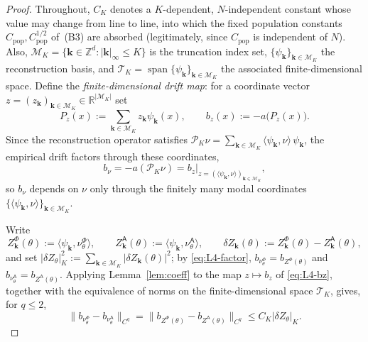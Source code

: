 \documentclass[a4paper,fleqn]{cas-sc}
\theoremstyle{definition}
\theoremstyle{remark}
\begin{document}
\begin{proof}
Throughout, $C_K$ denotes a $K$-dependent, $N$-independent constant whose value may
change from line to line, into which the fixed population constants
$C_{\mathrm{pop}},C_{\mathrm{pop}}^{1/2}$ of~(B3) are absorbed (legitimately, since $C_{\mathrm{pop}}$ is independent of $N$).
Also,
$\mathcal M_K=\{\mathbf k\in\mathbb Z^d:|\mathbf k|_\infty\le K\}$ is the truncation index
set, $\{\psi_{\mathbf k}\}_{\mathbf k\in\mathcal M_K}$ the reconstruction basis, and
$\mathcal T_K=\operatorname{span}\{\psi_{\mathbf k}\}_{\mathbf k\in\mathcal M_K}$ the associated
finite-dimensional space. Define the \emph{finite-dimensional drift map}: for a coordinate vector
$z=(z_{\mathbf k})_{\mathbf k\in\mathcal M_K}\in\mathbb R^{|\mathcal M_K|}$ set
\begin{equation}\label{eq:L4-bz}
P_z(x):=\sum_{\mathbf k\in\mathcal M_K}z_{\mathbf k}\psi_{\mathbf k}(x),\qquad
b_z(x):=-a\bigl(P_z(x)\bigr).
\end{equation}
Since the reconstruction operator satisfies
$\mathcal P_K\nu=\sum_{\mathbf k\in\mathcal M_K}\langle\psi_{\mathbf k},\nu\rangle\,\psi_{\mathbf k}$,
the empirical drift factors through these coordinates,
\begin{equation}\label{eq:L4-factor}
b_\nu=-a(\mathcal P_K\nu)
=b_z\big|_{z=(\langle\psi_{\mathbf k},\nu\rangle)_{\mathbf k\in\mathcal M_K}},
\end{equation}
so $b_\nu$ depends on $\nu$ only through the finitely many modal coordinates
$\{\langle\psi_{\mathbf k},\nu\rangle\}_{\mathbf k\in\mathcal M_K}$.

Write
\[
Z^\Phi_{\mathbf k}(\theta):=\langle\psi_{\mathbf k},\nu^\Phi_\theta\rangle,\qquad
Z^{\mathsf A}_{\mathbf k}(\theta):=\langle\psi_{\mathbf k},\nu^{\mathsf A}_\theta\rangle,\qquad
\delta Z_{\mathbf k}(\theta):=Z^\Phi_{\mathbf k}(\theta)-Z^{\mathsf A}_{\mathbf k}(\theta),
\]
and set
$|\delta Z_\theta|_K^2:=\sum_{\mathbf k\in\mathcal M_K}|\delta Z_{\mathbf k}(\theta)|^2$;
by \eqref{eq:L4-factor}, $b_{\nu^\Phi_\theta}=b_{Z^\Phi(\theta)}$ and
$b_{\nu^{\mathsf A}_\theta}=b_{Z^{\mathsf A}(\theta)}$. Applying Lemma~\ref{lem:coeff} to the map
$z\mapsto b_z$ of \eqref{eq:L4-bz}, together with the equivalence of norms on the
finite-dimensional space $\mathcal T_K$, gives, for $q\le2$,
\begin{equation}\label{eq:L4-coeff}
\|b_{\nu^\Phi_\theta}-b_{\nu^{\mathsf A}_\theta}\|_{C^q}
=\|b_{Z^\Phi(\theta)}-b_{Z^{\mathsf A}(\theta)}\|_{C^q}\le C_K|\delta Z_\theta|_K .
\end{equation}


\end{proof}
\end{document}
